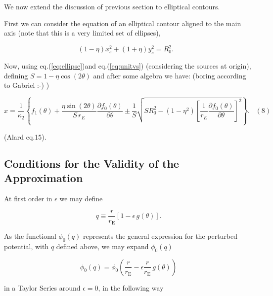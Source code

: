 \documentclass{article}
\def\be{\begin{equation}}
\def\ee{\end{equation}}
\def\eqref{eq.(\ref}
\newcommand{\eps}{\epsilon}
\def \eps {\epsilon}
\def \te {\theta}
\def \rre {\frac{r}{r_{\mathrm{E}}}}
\def \te {\theta}
\begin{document}
We now extend the discussion of previous section to elliptical contours.

First we can consider the equation of an elliptical contour aligned to
the main axis (note that this is a very limited set of ellipses),

\be
\label{eq:ellipse}
(1-\eta)x_s^2 + (1+\eta)y_s^2 = R_{0}^2.\;\;\; 
\ee



Now, using \eqref{eq:ellipse})and \eqref{eq:unitvs}) (considering the sources at origin), defining $S = 1-\eta \cos(2\theta)$ and after some algebra we have: (boring according to Gabriel :-) )

\be
x = \frac{1}{\kappa_2} \left\{f_{1}(\theta) + \frac{\eta\sin(2\theta)}{S \, r_E}\frac{\partial f_0(\theta)}{\partial \theta} \pm \frac{1}{S}\sqrt{SR_{0}^2 - (1-\eta^2)\left[ \frac{1}{r_E}\frac{\partial f_0(\theta)}{\partial \theta}\right]^2}  \right\}. \;\;\; (8)
\ee

(Alard eq.15).



\subsection{Conditions for the Validity of the Approximation}

At first order in $\eps$ we may define  

\begin{equation}
 q \equiv \frac{r}{r_{\mathrm{E}}}[1-\eps\,g(\te)].
\end{equation}

As the functional $\phi_0(q)$ represents the general expression 
for the perturbed potential, with $q$ defined above, we may expand $\phi_0(q)$

\begin{displaymath}
 \phi_0(q)=\phi_0\left(\rre-\eps\rre\,g(\te)\right)
\end{displaymath}

\noindent in a Taylor Series around $\eps=0$, in the following way
\end{document}
